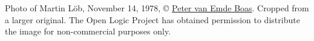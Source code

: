 Photo of Martin L\"ob, November 14, 1978, \copyright
\href{https://staff.fnwi.uva.nl/p.vanemdeboas/}{Peter van Emde Boas}.
Cropped from a larger original. The Open Logic Project has obtained
permission to distribute the image for non-commercial purposes only.

